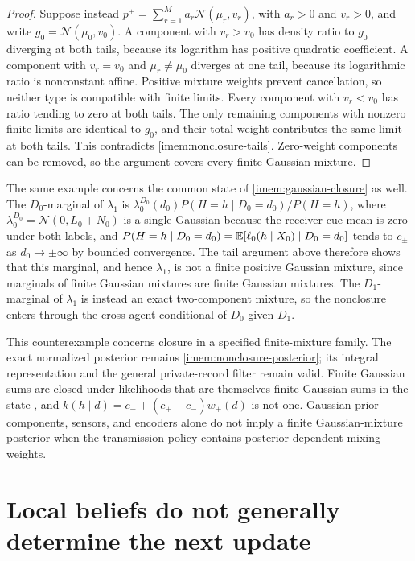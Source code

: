 \begin{proof}
Suppose instead $p^+=\sum_{r=1}^M a_r\mathcal N(\mu_r,v_r)$, with $a_r>0$ and $v_r>0$, and write $g_0=\mathcal N(\mu_0,v_0)$. A component with $v_r>v_0$ has density ratio to $g_0$ diverging at both tails, because its logarithm has positive quadratic coefficient. A component with $v_r=v_0$ and $\mu_r\ne\mu_0$ diverges at one tail, because its logarithmic ratio is nonconstant affine. Positive mixture weights prevent cancellation, so neither type is compatible with finite limits. Every component with $v_r<v_0$ has ratio tending to zero at both tails. The only remaining components with nonzero finite limits are identical to $g_0$, and their total weight contributes the same limit at both tails. This contradicts \cref{imem:nonclosure-tails}. Zero-weight components can be removed, so the argument covers every finite Gaussian mixture.
\end{proof}

The same example concerns the common state of \cref{imem:gaussian-closure} as well. The $D_0$-marginal of $\lambda_1$ is $\lambda_0^{D_0}(d_0)P(H=h\mid D_0=d_0)/P(H=h)$, where $\lambda_0^{D_0}=\mathcal N(0,L_0+N_0)$ is a single Gaussian because the receiver cue mean is zero under both labels, and $P(H=h\mid D_0=d_0)=\mathbb E[\ell_0(h\mid X_0)\mid D_0=d_0]$ tends to $c_\pm$ as $d_0\to\pm\infty$ by bounded convergence. The tail argument above therefore shows that this marginal, and hence $\lambda_1$, is not a finite positive Gaussian mixture, since marginals of finite Gaussian mixtures are finite Gaussian mixtures. The $D_1$-marginal of $\lambda_1$ is instead an exact two-component mixture, so the nonclosure enters through the cross-agent conditional of $D_0$ given $D_1$.

This counterexample concerns closure in a specified finite-mixture family. The exact normalized posterior remains \cref{imem:nonclosure-posterior}; its integral representation and the general private-record filter remain valid. Finite Gaussian sums are closed under likelihoods that are themselves finite Gaussian sums in the state \citep{SorensonAlspach1971}, and $k(h\mid d)=c_-+(c_+-c_-)w_+(d)$ is not one. Gaussian prior components, sensors, and encoders alone do not imply a finite Gaussian-mixture posterior when the transmission policy contains posterior-dependent mixing weights.

\section{Local beliefs do not generally determine the next update}

